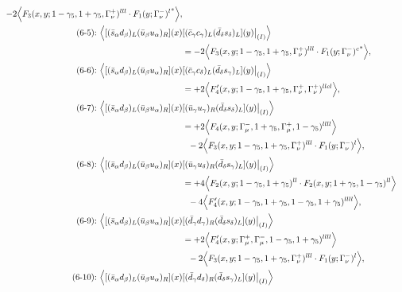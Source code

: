 \begin{align}
-2\Big\langle F_3(x,y;1-\gamma_5,1+\gamma_5,\Gamma_\nu^+)^{lll} \cdot {F_1(y;\Gamma_\nu^-)^l}^*\Big\rangle,
\\
\mbox{(6-5):}\ 
\Big\langle
[(\bar s_\alpha d_\beta)_L(\bar u_\beta u_\alpha)_R](x)&
[(\bar c_\gamma c_\gamma)_L(\bar d_\delta s_\delta)_L](y)\big|_{(I)}
\Big\rangle
\notag\\*
&=
-2\Big\langle F_3(x,y;1-\gamma_5,1+\gamma_5,\Gamma_\nu^+)^{lll} \cdot {F_1(y;\Gamma_\nu^-)^c}^*\Big\rangle,
\\
\mbox{(6-6):}\ 
\Big\langle
[(\bar s_\alpha d_\beta)_L(\bar u_\beta u_\alpha)_R](x)&
[(\bar c_\gamma c_\delta)_L(\bar d_\delta s_\gamma)_L](y)\big|_{(I)}
\Big\rangle
\notag\\*
&=
 + 2\Big\langle F_4'(x,y;1-\gamma_5,1+\gamma_5,\Gamma_\nu^+,\Gamma_\nu^+)^{llcl}\Big\rangle,
\\
\mbox{(6-7):}\ 
\Big\langle
[(\bar s_\alpha d_\beta)_L(\bar u_\beta u_\alpha)_R](x)&
[(\bar u_\gamma u_\gamma)_R(\bar d_\delta s_\delta)_L](y)\big|_{(I)}
\Big\rangle
\notag\\*
&=
 + 2\Big\langle F_4(x,y;\Gamma_\mu^-,1+\gamma_5,\Gamma_\mu^+,1-\gamma_5)^{llll}\Big\rangle
\notag\\*&\ \ 
-2\Big\langle F_3(x,y;1-\gamma_5,1+\gamma_5,\Gamma_\nu^+)^{lll} \cdot F_1(y;\Gamma_\nu^-)^l\Big\rangle,
\\
\mbox{(6-8):}\ 
\Big\langle
[(\bar s_\alpha d_\beta)_L(\bar u_\beta u_\alpha)_R](x)&
[(\bar u_\gamma u_\delta)_R(\bar d_\delta s_\gamma)_L](y)\big|_{(I)}
\Big\rangle
\notag\\*
&=
 + 4\Big\langle F_2(x,y;1-\gamma_5,1+\gamma_5)^{ll} \cdot F_2(x,y;1+\gamma_5,1-\gamma_5)^{ll}\Big\rangle
\notag\\*&\ \ 
-4\Big\langle F_4'(x,y;1-\gamma_5,1+\gamma_5,1-\gamma_5,1+\gamma_5)^{llll}\Big\rangle,
\\
\mbox{(6-9):}\ 
\Big\langle
[(\bar s_\alpha d_\beta)_L(\bar u_\beta u_\alpha)_R](x)&
[(\bar d_\gamma d_\gamma)_R(\bar d_\delta s_\delta)_L](y)\big|_{(I)}
\Big\rangle
\notag\\*
&=
 + 2\Big\langle F_4'(x,y;\Gamma_\mu^+,\Gamma_\mu^-,1-\gamma_5,1+\gamma_5)^{llll}\Big\rangle
\notag\\*&\ \ 
-2\Big\langle F_3(x,y;1-\gamma_5,1+\gamma_5,\Gamma_\nu^+)^{lll} \cdot F_1(y;\Gamma_\nu^-)^l\Big\rangle,
\\
\mbox{(6-10):}\ 
\Big\langle
[(\bar s_\alpha d_\beta)_L(\bar u_\beta u_\alpha)_R](x)&
[(\bar d_\gamma d_\delta)_R(\bar d_\delta s_\gamma)_L](y)\big|_{(I)}
\Big\rangle
\notag\\*

\end{align}
